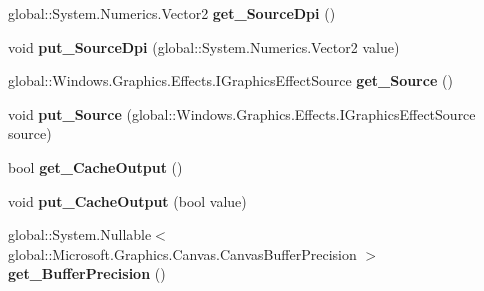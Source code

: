 \begin{DoxyCompactItemize}
global\+::\+System.\+Numerics.\+Vector2 {\bfseries get\+\_\+\+Source\+Dpi} ()
\item 
\mbox{\label{class_microsoft_1_1_graphics_1_1_canvas_1_1_effects_1_1_dpi_compensation_effect_ae562d1d30976c9ba693a67de919e272a}} 
void {\bfseries put\+\_\+\+Source\+Dpi} (global\+::\+System.\+Numerics.\+Vector2 value)
\item 
\mbox{\label{class_microsoft_1_1_graphics_1_1_canvas_1_1_effects_1_1_dpi_compensation_effect_ad4e3622fd4c21cbed4bbc30f5bca8e6c}} 
global\+::\+Windows.\+Graphics.\+Effects.\+I\+Graphics\+Effect\+Source {\bfseries get\+\_\+\+Source} ()
\item 
\mbox{\label{class_microsoft_1_1_graphics_1_1_canvas_1_1_effects_1_1_dpi_compensation_effect_a9757cf2afe58883b620d18466fa4301f}} 
void {\bfseries put\+\_\+\+Source} (global\+::\+Windows.\+Graphics.\+Effects.\+I\+Graphics\+Effect\+Source source)
\item 
\mbox{\label{class_microsoft_1_1_graphics_1_1_canvas_1_1_effects_1_1_dpi_compensation_effect_a7ec44257a5eb79a4b4d6ada66d09b56b}} 
bool {\bfseries get\+\_\+\+Cache\+Output} ()
\item 
\mbox{\label{class_microsoft_1_1_graphics_1_1_canvas_1_1_effects_1_1_dpi_compensation_effect_afde2778a436d181b229718ebd7d43df2}} 
void {\bfseries put\+\_\+\+Cache\+Output} (bool value)
\item 
\mbox{\label{class_microsoft_1_1_graphics_1_1_canvas_1_1_effects_1_1_dpi_compensation_effect_ad012672346bf689a6c4c6b8ea1a58331}} 
global\+::\+System.\+Nullable$<$ global\+::\+Microsoft.\+Graphics.\+Canvas.\+Canvas\+Buffer\+Precision $>$ {\bfseries get\+\_\+\+Buffer\+Precision} ()
\item 
\mbox{\label{class_microsoft_1_1_graphics_1_1_canvas_1_1_effects_1_1_dpi_compensation_effect_ad8bd2812bdcbdbfee9d0809f3c8ffe56}} 

\end{DoxyCompactItemize}
